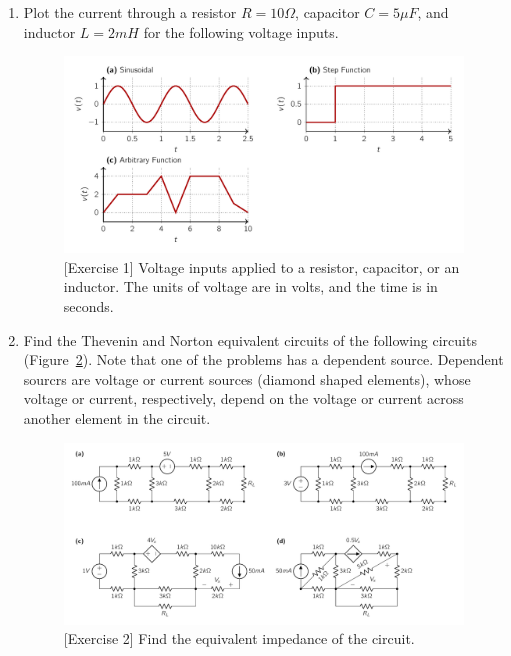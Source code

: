\begin{enumerate}
    \item Plot the current through a resistor $R = 10\Omega$, capacitor $C = 5\mu F$, and inductor $L = 2mH$ for the following voltage inputs.
    \begin{figure}[h]
        \centering
        \includegraphics[width=\textwidth]{figure/ch02/ex02-01.pdf}
        \caption{[Exercise 1] Voltage inputs applied to a resistor, capacitor, or an inductor. The units of voltage are in volts, and the time is in seconds.}
        \label{fig:ex02-01}
    \end{figure}
    
    \item Find the Thevenin and Norton equivalent circuits of the following circuits (Figure~\ref{fig:ex02-02}). Note that one of the problems has a dependent source. Dependent sourcrs are voltage or current sources (diamond shaped elements), whose voltage or current, respectively, depend on the voltage or current across another element in the circuit.
    \begin{figure}[h]
        \centering
        \includegraphics[width=\textwidth]{figure/ch02/ex02-02.pdf}
        \caption{[Exercise 2] Find the equivalent impedance of the circuit.}
        \label{fig:ex02-02}
    \end{figure}
    

\end{enumerate}
